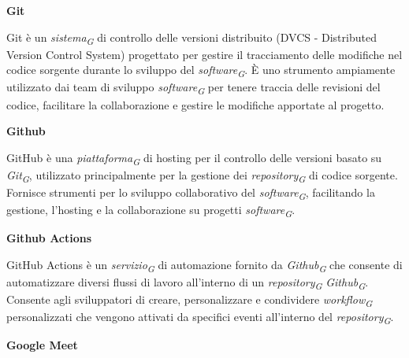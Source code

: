 \documentclass{article}
\begin{document}
\vspace{0.4cm}

\textbf{Git}

\vspace{0.1cm}

Git è un \textit{sistema}\textsubscript{\textit{G}} di controllo delle versioni distribuito (DVCS - Distributed Version Control System) progettato per gestire il tracciamento delle modifiche nel codice sorgente durante lo sviluppo del \textit{software}\textsubscript{\textit{G}}. È uno strumento ampiamente utilizzato dai team di sviluppo \textit{software}\textsubscript{\textit{G}} per tenere traccia delle revisioni del codice, facilitare la collaborazione e gestire le modifiche apportate al progetto.

\vspace{0.4cm}

\textbf{Github}

\vspace{0.1cm}

GitHub è una \textit{piattaforma}\textsubscript{\textit{G}} di hosting per il controllo delle versioni basato su \textit{Git}\textsubscript{\textit{G}}, utilizzato principalmente per la gestione dei \textit{repository}\textsubscript{\textit{G}} di codice sorgente. Fornisce strumenti per lo sviluppo collaborativo del \textit{software}\textsubscript{\textit{G}}, facilitando la gestione, l'hosting e la collaborazione su progetti \textit{software}\textsubscript{\textit{G}}.

\vspace{0.4cm}

\textbf{Github Actions}

\vspace{0.1cm}

GitHub Actions è un \textit{servizio}\textsubscript{\textit{G}} di automazione fornito da \textit{Github}\textsubscript{\textit{G}} che consente di automatizzare diversi flussi di lavoro all'interno di un \textit{repository}\textsubscript{\textit{G}} \textit{Github}\textsubscript{\textit{G}}. Consente agli sviluppatori di creare, personalizzare e condividere \textit{workflow}\textsubscript{\textit{G}} personalizzati che vengono attivati da specifici eventi all'interno del \textit{repository}\textsubscript{\textit{G}}.

\vspace{0.4cm}

\textbf{Google Meet}

\vspace{0.1cm}
\end{document}
